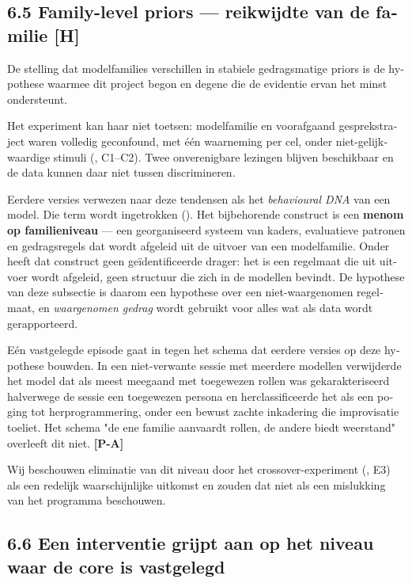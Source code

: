 \begin{dutch}
\subsection*{6.5 Family-level priors — reikwijdte van de familie \textbf{[H]}}
\label{sec:nl:6.5}

De stelling dat modelfamilies verschillen in stabiele gedragsmatige priors is de hypothese waarmee dit project begon en degene die de evidentie ervan het minst ondersteunt.

Het experiment kan haar niet toetsen: modelfamilie en voorafgaand gesprekstraject waren volledig geconfound, met één waarneming per cel, onder niet-gelijkwaardige stimuli (, C1–C2). Twee onverenigbare lezingen blijven beschikbaar en de data kunnen daar niet tussen discrimineren.

Eerdere versies verwezen naar deze tendensen als het \emph{behavioural DNA} van een model. Die term wordt ingetrokken (). Het bijbehorende construct is een \textbf{menom op familieniveau} — een georganiseerd systeem van kaders, evaluatieve patronen en gedragsregels dat wordt afgeleid uit de uitvoer van een modelfamilie. Onder  heeft dat construct geen geïdentificeerde drager: het is een regelmaat die uit uitvoer wordt afgeleid, geen structuur die zich in de modellen bevindt. De hypothese van deze subsectie is daarom een hypothese over een niet-waargenomen regelmaat, en \emph{waargenomen gedrag} wordt gebruikt voor alles wat als data wordt gerapporteerd.

Eén vastgelegde episode gaat in tegen het schema dat eerdere versies op deze hypothese bouwden. In een niet-verwante sessie met meerdere modellen verwijderde het model dat als meest meegaand met toegewezen rollen was gekarakteriseerd halverwege de sessie een toegewezen persona en herclassificeerde het als een poging tot herprogrammering, onder een bewust zachte inkadering die improvisatie toeliet. Het schema "de ene familie aanvaardt rollen, de andere biedt weerstand" overleeft dit niet. \textbf{[P-A]}

Wij beschouwen eliminatie van dit niveau door het crossover-experiment (, E3) als een redelijk waarschijnlijke uitkomst en zouden dat niet als een mislukking van het programma beschouwen.


\subsection*{6.6 Een interventie grijpt aan op het niveau waar de core is vastgelegd}
\label{sec:nl:6.6}


\end{dutch}
